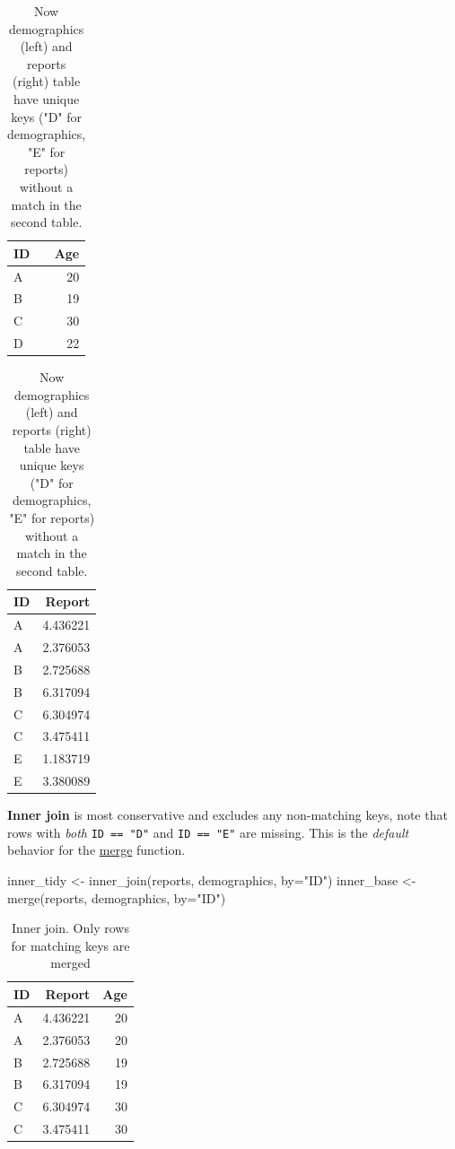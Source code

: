 \documentclass[
]{book}
\newenvironment{Shaded}{\begin{snugshade}}{\end{snugshade}}
\newcommand{\AttributeTok}[1]{\textcolor[rgb]{0.77,0.63,0.00}{#1}}
\newcommand{\FunctionTok}[1]{\textcolor[rgb]{0.00,0.00,0.00}{#1}}
\newcommand{\NormalTok}[1]{#1}
\newcommand{\OtherTok}[1]{\textcolor[rgb]{0.56,0.35,0.01}{#1}}
\newcommand{\StringTok}[1]{\textcolor[rgb]{0.31,0.60,0.02}{#1}}
\begin{document}
\begin{table}
\caption{\label{tab:unnamed-chunk-180}Now demographics (left) and reports (right) table have unique keys ("D" for demographics, "E" for reports) without a match in the second table.}

\centering
\begin{tabular}[t]{l|r}
\hline
ID & Age\\
\hline
A & 20\\
\hline
B & 19\\
\hline
C & 30\\
\hline
D & 22\\
\hline
\end{tabular}
\centering
\begin{tabular}[t]{l|r}
\hline
ID & Report\\
\hline
A & 4.436221\\
\hline
A & 2.376053\\
\hline
B & 2.725688\\
\hline
B & 6.317094\\
\hline
C & 6.304974\\
\hline
C & 3.475411\\
\hline
E & 1.183719\\
\hline
E & 3.380089\\
\hline
\end{tabular}
\end{table}

\textbf{Inner join} is most conservative and excludes any non-matching keys, note that rows with \emph{both} \texttt{ID\ ==\ "D"} and \texttt{ID\ ==\ "E"} are missing. This is the \emph{default} behavior for the \href{https://stat.ethz.ch/R-manual/R-devel/library/base/html/merge.html}{merge} function.

\begin{Shaded}
\begin{Highlighting}[]
\NormalTok{inner\_tidy }\OtherTok{\textless{}{-}} \FunctionTok{inner\_join}\NormalTok{(reports, demographics, }\AttributeTok{by=}\StringTok{"ID"}\NormalTok{) }
\NormalTok{inner\_base }\OtherTok{\textless{}{-}} \FunctionTok{merge}\NormalTok{(reports, demographics, }\AttributeTok{by=}\StringTok{"ID"}\NormalTok{)}
\end{Highlighting}
\end{Shaded}

\begin{table}

\caption{\label{tab:unnamed-chunk-182}Inner join. Only rows for matching keys are merged}
\centering
\begin{tabular}[t]{l|r|r}
\hline
ID & Report & Age\\
\hline
A & 4.436221 & 20\\
\hline
A & 2.376053 & 20\\
\hline
B & 2.725688 & 19\\
\hline
B & 6.317094 & 19\\
\hline
C & 6.304974 & 30\\
\hline
C & 3.475411 & 30\\
\hline
\end{tabular}
\end{table}
\end{document}
